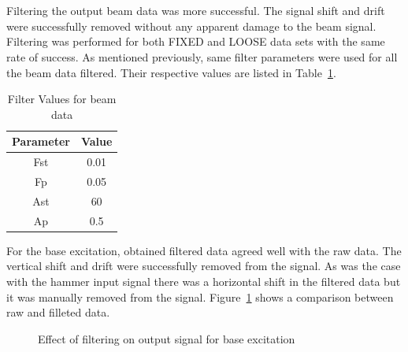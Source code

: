 \documentclass[paper=a4, fontsize=12pt]{scrartcl} %
\begin{document}
\\
\\
Filtering the output beam data was more successful. The signal shift and drift were successfully removed without any apparent damage to the beam signal. Filtering was performed for both FIXED and LOOSE data sets with the same rate of success. As mentioned previously, same filter parameters were used for all the beam data filtered. Their respective values are listed in Table~\ref{table:filterVals}.
%
\begin{table}[H]
\centering
\begin{tabular}{ c | c }
		\textbf{Parameter} & \textbf{Value} \\
	\hline                       
		Fst & 0.01 \\
	\hline
		Fp & 0.05 \\
	\hline
		Ast & 60 \\
	\hline  
		Ap & 0.5 \\
\end{tabular}
\caption{Filter Values for beam data}
\label{table:filterVals}
\end{table}
%
For the base excitation, obtained filtered data agreed well with the raw data. The vertical shift and drift were successfully removed from the signal. As was the case with the hammer input signal there was a horizontal shift in the filtered data but it was manually removed from the signal. Figure~\ref{fig:outputSigFilterBase} shows a comparison between raw and filleted data.
%
	\begin{figure}[H]
		\centering
		\quad
		\caption{Effect of filtering on output signal for base excitation}
		\label{fig:outputSigFilterBase}
	\end{figure}
\end{document}
